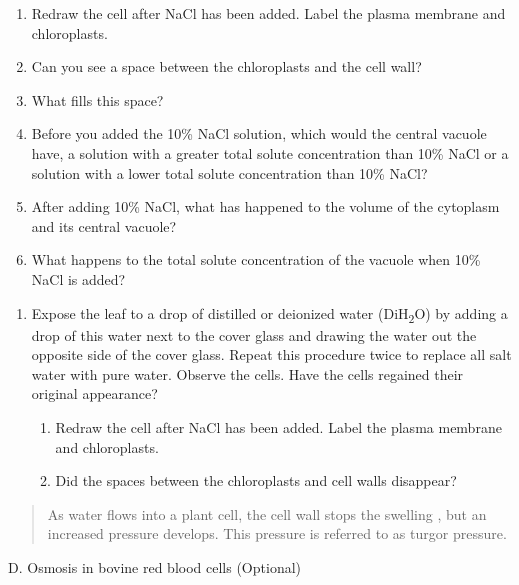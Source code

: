 \documentclass[
  letterpaper,
  DIV=11,
  numbers=noendperiod]{scrreprt}
\begin{document}
\begin{enumerate}
\def\labelenumi{\alph{enumi}.}
\item
  Redraw the cell after NaCl has been added. Label the plasma membrane
  and chloroplasts.
\item
  Can you see a space between the chloroplasts and the cell wall?
\item
  What fills this space?
\item
  Before you added the 10\% NaCl solution, which would the central
  vacuole have, a solution with a greater total solute concentration
  than 10\% NaCl or a solution with a lower total solute concentration
  than 10\% NaCl?
\item
  After adding 10\% NaCl, what has happened to the volume of the
  cytoplasm and its central vacuole?
\item
  What happens to the total solute concentration of the vacuole when
  10\% NaCl is added?
\end{enumerate}

\begin{enumerate}
\def\labelenumi{\arabic{enumi}.}
\setcounter{enumi}{2}
\item
  Expose the leaf to a drop of distilled or deionized water
  (DiH\textsubscript{2}O) by adding a drop of this water next to the
  cover glass and drawing the water out the opposite side of the cover
  glass. Repeat this procedure twice to replace all salt water with pure
  water. Observe the cells. Have the cells regained their original
  appearance?

  \begin{enumerate}
  \def\labelenumii{\alph{enumii}.}
  \item
    Redraw the cell after NaCl has been added. Label the plasma membrane
    and chloroplasts.
  \item
    Did the spaces between the chloroplasts and cell walls disappear?
  \end{enumerate}
\end{enumerate}

\begin{quote}
As water flows into a plant cell, the cell wall stops the swelling , but
an increased pressure develops. This pressure is referred to as turgor
pressure.
\end{quote}

D. Osmosis in bovine red blood cells (Optional)
\end{document}
